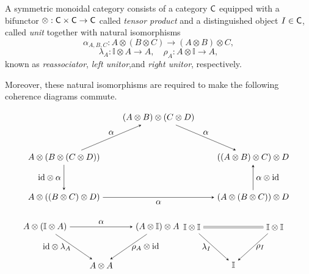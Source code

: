 \begin{definition}
  A symmetric monoidal category consists of a category $\mathsf{C}$ equipped with a bifunctor $\otimes : \mathsf{C} \times \mathsf{C} \to \mathsf{C}$
called \emph{tensor product} and a distinguished object $I \in \mathsf{C}$, called \emph{unit} together with natural isomorphisms
\[
\alpha_{A,B,C} : A \otimes (B \otimes C) \rightarrow (A \otimes B) \otimes C,
\]
\[
\lambda_A :\mathbb{I}\otimes A \rightarrow A, \quad \rho_A : A \otimes\mathbb{I}\rightarrow A,
\]
known as \emph{reassociator}, \emph{left unitor},and \emph{right unitor}, respectively.

Moreover, these natural isomorphisms are required to make the following coherence diagrams commute.
\[
\begin{tikzpicture}
  \matrix (m) [matrix of math nodes,row sep=3em,column sep=2em,minimum width=1em]
  {
    & (A \otimes B) \otimes (C \otimes D) & \\
   A \otimes (B \otimes (C \otimes D)) &  & ((A \otimes B) \otimes C) \otimes D  \\
    A \otimes ((B \otimes C) \otimes D)  & &  (A \otimes (B \otimes C)) \otimes D \\
  };
  \path[-stealth]
    (m-1-2) edge  node [above] {$\alpha$} (m-2-3)
    (m-3-3) edge  node [right] {$\alpha \otimes \id$} (m-2-3)
    (m-3-1) edge  node [below] {$\alpha$} (m-3-3)
    (m-2-1) edge  node [left] {$\id \otimes \alpha$} (m-3-1)
    (m-2-1) edge  node [above] {$\alpha$} (m-1-2)
    ;
\end{tikzpicture}
\]


\[
\begin{minipage}{0.45\textwidth}
\centering
\begin{tikzpicture}
  \matrix (m) [matrix of math nodes,row sep=3em,column sep=2em,minimum width=1em]
  {
    A \otimes (\mathbb{I} \otimes A) &   & (A \otimes \mathbb{I}) \otimes A \\
     & A \otimes A & \\
  };
  \path[-stealth]
    (m-1-1) edge  node [above] {$\alpha$} (m-1-3)
    (m-1-1) edge  node [left] {$\id \otimes \lambda_A$} (m-2-2)
    (m-1-3) edge  node [right] {$\rho_A \otimes \id$} (m-2-2);
\end{tikzpicture}
\end{minipage}
\quad \quad
\begin{minipage}{0.45\textwidth}
\centering
\begin{tikzpicture}
  \matrix (m) [matrix of math nodes,row sep=3em,column sep=3em,minimum width=1em]
  {
   \mathbb{I}\otimes\mathbb{I}&   &\mathbb{I}\otimes\mathbb{I} \\
     &\mathbb{I}& \\
  };
  \path[-stealth]
    (m-1-1) edge  node [left] {$\lambda_I$} (m-2-2)
    (m-1-3) edge  node [right] {$\rho_I$} (m-2-2);
  \draw[double equal sign distance] (m-1-1) -- (m-1-3);
\end{tikzpicture}
\end{minipage}
\]

\end{definition}






